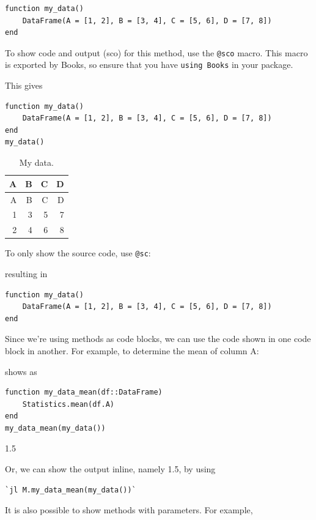 \documentclass[
  14pt
  american,
  paper=a4,
  ,captions=tableheading
]{scrreprt}
\newcommand{\passthrough}[1]{#1}
\begin{document}
\begin{lstlisting}
function my_data()
    DataFrame(A = [1, 2], B = [3, 4], C = [5, 6], D = [7, 8])
end
\end{lstlisting}

To show code and output (sco) for this method, use the
\passthrough{\lstinline!@sco!} macro. This macro is exported by Books,
so ensure that you have \passthrough{\lstinline!using Books!} in your
package.

This gives

\begin{lstlisting}
function my_data()
    DataFrame(A = [1, 2], B = [3, 4], C = [5, 6], D = [7, 8])
end
my_data()
\end{lstlisting}

\hypertarget{tbl:my_data}{}
\begin{longtable}[]{@{}rrrr@{}}
\caption{\label{tbl:my_data}My data.}\tabularnewline
\toprule
A & B & C & D \\
\midrule
\endfirsthead
\toprule
A & B & C & D \\
\midrule
\endhead
1 & 3 & 5 & 7 \\
2 & 4 & 6 & 8 \\
\bottomrule
\end{longtable}

To only show the source code, use \passthrough{\lstinline!@sc!}:

resulting in

\begin{lstlisting}
function my_data()
    DataFrame(A = [1, 2], B = [3, 4], C = [5, 6], D = [7, 8])
end
\end{lstlisting}

Since we're using methods as code blocks, we can use the code shown in
one code block in another. For example, to determine the mean of column
A:

shows as

\begin{lstlisting}
function my_data_mean(df::DataFrame)
    Statistics.mean(df.A)
end
my_data_mean(my_data())
\end{lstlisting}

1.5

Or, we can show the output inline, namely 1.5, by using

\begin{lstlisting}
`jl M.my_data_mean(my_data())`
\end{lstlisting}

It is also possible to show methods with parameters. For example,
\end{document}
